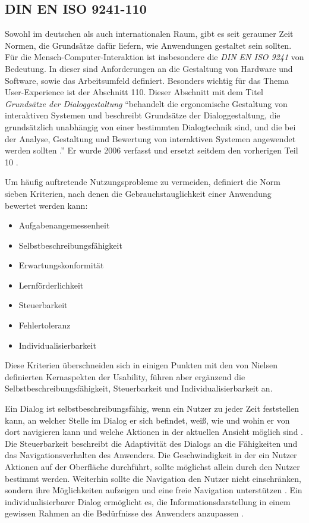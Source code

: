 \subsection{DIN EN ISO 9241-110} \label{sec:uidNorms}
Sowohl im deutschen als auch internationalen Raum, gibt es seit geraumer Zeit Normen, die Grundsätze dafür liefern, wie Anwendungen gestaltet sein sollten. Für die Mensch-Computer-Interaktion ist insbesondere die \textit{DIN EN ISO 9241} von Bedeutung. In dieser sind Anforderungen an die Gestaltung von Hardware und Software, sowie das Arbeitsumfeld definiert. Besonders wichtig für das Thema User-Experience ist der Abschnitt 110. Dieser Abschnitt mit dem Titel \textit{Grundsätze der Dialoggestaltung} \enquote{behandelt die ergonomische Gestaltung von interaktiven Systemen und beschreibt Grundsätze der Dialoggestaltung, die grundsätzlich unabhängig von einer bestimmten Dialogtechnik sind, und die bei der Analyse, Gestaltung und Bewertung von interaktiven Systemen angewendet werden sollten \cite[S. 4]{DIN2006}.} Er wurde 2006 verfasst und ersetzt seitdem den vorherigen Teil 10 \cite{DIN2006}.\par
Um häufig auftretende Nutzungsprobleme zu vermeiden, definiert die Norm sieben Kriterien, nach denen die Gebrauchstauglichkeit einer Anwendung bewertet werden kann:
\begin{itemize}
	\item Aufgabenangemessenheit
	\item Selbstbeschreibungsfähigkeit
	\item Erwartungskonformität
	\item Lernförderlichkeit
	\item Steuerbarkeit
	\item Fehlertoleranz
	\item Individualisierbarkeit \cite[S. 7]{DIN2006}
\end{itemize}
Diese Kriterien überschneiden sich in einigen Punkten mit den von Nielsen definierten Kernaspekten der Usability, führen aber ergänzend die Selbstbeschreibungsfähigkeit, Steuerbarkeit und Individualisierbarkeit an.\par
Ein Dialog ist selbstbeschreibungsfähig, wenn ein Nutzer zu jeder Zeit feststellen kann, an welcher Stelle im Dialog er sich befindet, weiß, wie und wohin er von dort navigieren kann und welche Aktionen in der aktuellen Ansicht möglich sind \cite[S. 10]{DIN2006}. Die Steuerbarkeit beschreibt die Adaptivität des Dialogs an die Fähigkeiten und das Navigationsverhalten des Anwenders. Die Geschwindigkeit in der ein Nutzer Aktionen auf der Oberfläche durchführt, sollte möglichst allein durch den Nutzer bestimmt werden. Weiterhin sollte die Navigation den Nutzer nicht einschränken, sondern ihre Möglichkeiten aufzeigen und eine freie Navigation unterstützen \cite[S.13]{DIN2006}. Ein individualisierbarer Dialog ermöglicht es, die Informationsdarstellung in einem gewissen Rahmen an die Bedürfnisse des Anwenders anzupassen \cite[S.15]{DIN2006}. \par
